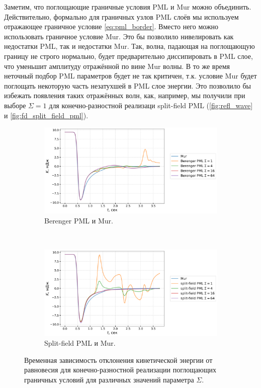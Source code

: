 Заметим, что поглощающие граничные условия PML и Mur можно объединить. Действительно, формально для граничных узлов PML слоёв мы используем отражающее граничное условие \eqref{eq:pml_border}. Вместо него можно использовать граничное условие Mur. Это бы позволило нивелировать как  недостатки PML, так и недостатки Mur. Так, волна, падающая на поглощающую границу не строго нормально, будет предварительно диссипировать в PML слое, что уменьшит амплитуду отражённой по вине Mur волны. В то же время неточный подбор PML параметров будет не так критичен, т.к. условие Mur будет поглощать некоторую часть незатухшей в PML слое энергии. Это позволило бы избежать появления таких отражённых волн, как, например, мы получили при выборе $\Sigma=1$ для конечно-разностной реализаци split-field PML (\autoref{fig:refl_wave} и \autoref{fig:fd_split_field_pml}).

\begin{figure}[htb]
\centering
    \begin{subfigure}{1.0\textwidth}
        \centering
        \includegraphics[width=1.0\textwidth]{images/pml/fd_Berenger.png}
        \caption{Berenger PML и Mur.}
        \label{fig:fd_Berenger_pml}
    \end{subfigure}
\vspace{0.5cm}\\
    \begin{subfigure}{1.0\textwidth}
        \centering
        \includegraphics[width=1.0\textwidth]{images/pml/fd_split-field.png}
        \caption{Split-field PML и Mur.}
        \label{fig:fd_split_field_pml}
    \end{subfigure}
\caption{Временная зависимость отклонения кинетической энергии от равновесия для конечно-разностной реализации поглощающих граничных условий для различных значений параметра $\Sigma$.}
\label{fig:fd_pml}
\end{figure}

